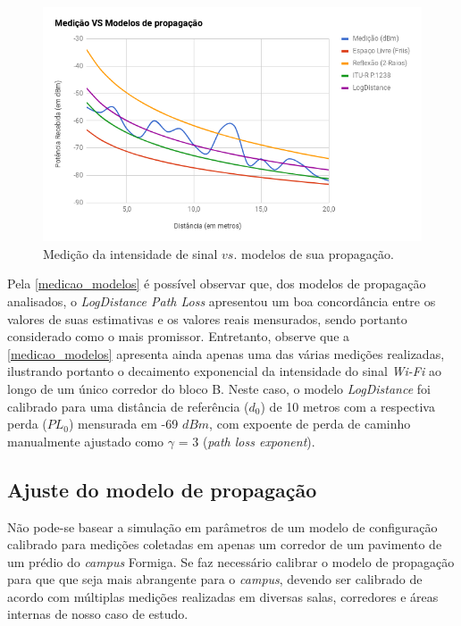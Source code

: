 \documentclass[
	12pt,				%
	twoside,			%
	a4paper,			%
	english,			%
	french,				%
	spanish,			%
	brazil				%
	]{abntex2}
\begin{document}
\begin{figure}[htb]
    \caption{\label{medicao_modelos} Medição da intensidade de sinal $vs.$ modelos de sua propagação.}
    \begin{center}
        \includegraphics[scale=0.68]{imagens/medicao-modelos.jpg}
    \end{center}
\end{figure}

Pela \autoref{medicao_modelos} é possível observar que, dos modelos de
propagação analisados, o \emph{LogDistance Path Loss} apresentou um boa
concordância entre os valores de suas estimativas e os valores reais
mensurados, sendo portanto considerado como o mais promissor.
Entretanto, observe que a \autoref{medicao_modelos} apresenta ainda
apenas uma das várias medições realizadas, ilustrando portanto o
decaimento exponencial da intensidade do sinal \emph{Wi-Fi} ao longo de
um único corredor do bloco B. Neste caso, o modelo \emph{LogDistance}
foi calibrado para uma distância de referência (\(d_{0}\)) de 10 metros
com a respectiva perda (\(PL_{0}\)) mensurada em -69 \(dBm\), com
expoente de perda de caminho manualmente ajustado como \(\gamma\) = 3
(\emph{path loss exponent}).

\subsection{Ajuste do modelo de
propagação}\label{ajuste-do-modelo-de-propagauxe7uxe3o}

Não pode-se basear a simulação em parâmetros de um modelo de
configuração calibrado para medições coletadas em apenas um corredor de
um pavimento de um prédio do \emph{campus} Formiga. Se faz necessário
calibrar o modelo de propagação para que que seja mais abrangente para o
\emph{campus}, devendo ser calibrado de acordo com múltiplas medições
realizadas em diversas salas, corredores e áreas internas de nosso caso
de estudo.
\end{document}
